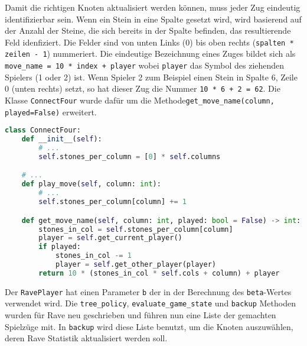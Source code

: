 Damit die richtigen Knoten aktualisiert werden können, muss jeder Zug eindeutig identifizierbar sein.
Wenn ein Stein in eine Spalte gesetzt wird, wird basierend auf der Anzahl der Steine, die sich bereits in der Spalte befinden, das resultierende Feld idenfiziert.
Die Felder sind von unten Links (0) bis oben rechts (\verb|spalten * zeilen - 1|) nummeriert.
Die eindeutige Bezeichnung eines Zuges bildet sich als \verb|move_name = 10 * index + player| wobei \verb|player| das Symbol des ziehenden Spielers (1 oder 2) ist.
Wenn Spieler 2 zum Beispiel einen Stein in Spalte 6, Zeile 0 (unten rechts) setzt, so hat dieser Zug die Nummer \verb|10 * 6 + 2 = 62|.
Die Klasse \verb|ConnectFour| wurde dafür um die Methode\linebreak[2] \texttt{get\_move\_name(column, played=False)} erweitert.

\begin{lstlisting}[language=Python,label={lst:move-name}]
class ConnectFour:
    def __init__(self):
        # ...
        self.stones_per_column = [0] * self.columns

    # ...
    def play_move(self, column: int):
        # ...
        self.stones_per_column[column] += 1

    def get_move_name(self, column: int, played: bool = False) -> int:
        stones_in_col = self.stones_per_column[column]
        player = self.get_current_player()
        if played:
            stones_in_col -= 1
            player = self.get_other_player(player)
        return 10 * (stones_in_col * self.cols + column) + player
\end{lstlisting}

Der \verb|RavePlayer| hat einen Parameter \verb|b| der in der Berechnung des \verb|beta|-Wertes verwendet wird.
Die \verb|tree_policy|, \verb|evaluate_game_state| und \verb|backup| Methoden wurden für Rave neu geschrieben und führen nun eine Liste der gemachten Spielzüge mit.
In \verb|backup| wird diese Liste benutzt, um die Knoten auszuwählen, deren Rave Statistik aktualisiert werden soll.

